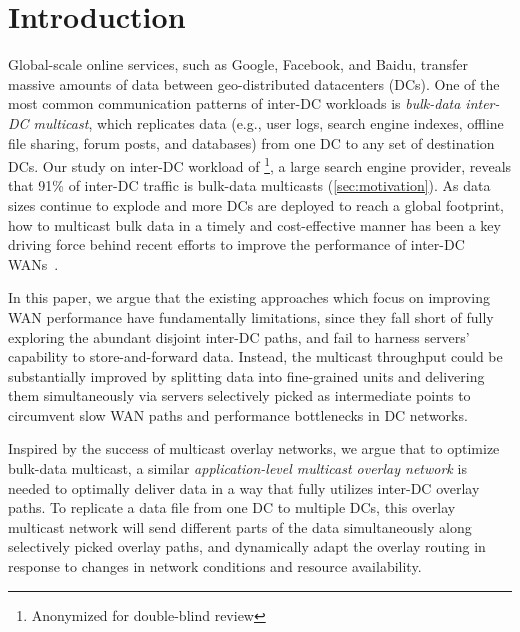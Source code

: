 \section{Introduction}

Global-scale online services, such as Google, Facebook, and
Baidu, transfer massive amounts of data between geo-distributed
datacenters (DCs).
One of the most common communication patterns of inter-DC workloads
is {\em bulk-data inter-DC multicast},
which replicates data (e.g., user
logs, search engine indexes, offline file sharing, forum posts, and
databases) from one DC to any set of destination DCs.
Our study on inter-DC workload of \company\footnote{Anonymized for
double-blind review}, a large search engine provider, reveals that
91\% of inter-DC traffic is bulk-data multicasts
(\Section\ref{sec:motivation}).
As data sizes continue to explode and more DCs are deployed to
reach a global footprint, how to multicast bulk data in a timely
and cost-effective manner has been a key driving force behind
recent efforts to improve the performance of inter-DC
WANs~\cite{savage1999Theend,jain2013b4,kumar2015bwe,hong2013achieving,zhang2015guarantee}.



In this paper, we argue that the existing approaches which focus
on improving WAN performance have fundamentally limitations,
since they fall short of fully exploring the abundant
disjoint inter-DC paths, and fail to harness servers'
capability to store-and-forward data.
Instead, the multicast throughput could be substantially
improved by splitting data into fine-grained units and delivering
them simultaneously via servers selectively picked as
intermediate points to circumvent slow WAN paths and performance
bottlenecks in DC networks.


Inspired by the success of multicast overlay
networks, we argue that to optimize bulk-data multicast,
a similar {\em application-level multicast
overlay network} is needed to optimally deliver data in a way that
fully utilizes inter-DC overlay paths.
To replicate a data file from one DC to multiple DCs, this overlay
multicast network will send different parts of the data
simultaneously along selectively picked overlay paths, and
dynamically adapt the overlay routing in response to changes in
network conditions and resource availability.


